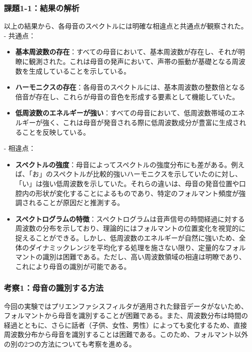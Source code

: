 \documentclass{article}
\begin{document}
\subsubsection*{課題1-1：結果の解析}
\begin{spacing}{1.2}
以上の結果から、各母音のスペクトルには明確な相違点と共通点が観察された。\\
- 共通点：
\begin{itemize}
    \item \textbf{基本周波数の存在}：すべての母音において、基本周波数が存在し、それが明瞭に観測された。これは母音の発声において、声帯の振動が基礎となる周波数を生成していることを示している。
    \item \textbf{ハーモニクスの存在}：各母音のスペクトルには、基本周波数の整数倍となる倍音が存在し、これらが母音の音色を形成する要素として機能していた。
    \item \textbf{低周波数のエネルギーが強い}：すべての母音において、低周波数帯域のエネルギーが強く、これは母音が発音される際に低周波数成分が豊富に生成されることを反映している。
\end{itemize}
- 相違点：
\begin{itemize}
    \item \textbf{スペクトルの強度}：母音によってスペクトルの強度分布にも差がある。例えば、「お」のスペクトルが比較的強いハーモニクスを示していたのに対し、「い」は強い低周波数を示していた。それらの違いは、母音の発音位置や口腔内の形状が変化することによるものであり、特定のフォルマント頻度が強調されることが原因だと推測する。
    \item \textbf{スペクトログラムの特徴}：スペクトログラムは音声信号の時間経過に対する周波数の分布を示しており、理論的にはフォルマントの位置変化を視覚的に捉えることができる。しかし、低周波数のエネルギーが自然に強いため、全体のダイナミックレンジを平均化する処理を施さない限り、定量的なフォルマントの識別は困難である。ただし、高い周波数領域の相違は明瞭であり、これにより母音の識別が可能である。
\end{itemize}
\end{spacing}

\subsubsection{考察1：母音の識別する方法}
\begin{spacing}{1.2}
    今回の実験ではプリエンファシスフィルタが適用された録音データがないため、フォルマントから母音を識別することが困難である。また、周波数分布は時間の経過とともに、さらに話者（子供、女性、男性）によっても変化するため、直接周波数分布から母音を識別することは困難である。このため、フォルマント以外の別の2つの方法についても考察を進める。
\end{spacing}
\end{document}

